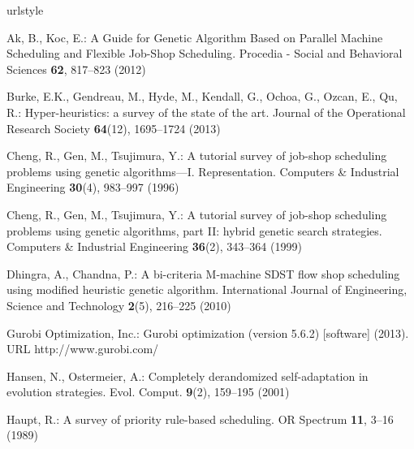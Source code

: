 \documentclass[graybox]{svmult}
\begin{document}
\clearpage

%
\begin{thebibliography}{10}
    \providecommand{\url}[1]{{#1}}
    \providecommand{\urlprefix}{URL }
    \expandafter\ifx\csname urlstyle\endcsname\relax
    \providecommand{\doi}[1]{DOI~\discretionary{}{}{}#1}\else
    \providecommand{\doi}{DOI~\discretionary{}{}{}\begingroup
    \urlstyle{rm}\Url}\fi
    
    Ak, B., Koc, E.: {A Guide for Genetic Algorithm Based on Parallel Machine  
    Scheduling and Flexible Job-Shop Scheduling}.
    \newblock Procedia - Social and Behavioral Sciences \textbf{62}, 817--823
    (2012)
    
    Burke, E.K., Gendreau, M., Hyde, M., Kendall, G., Ochoa, G., Ozcan, E., Qu, 
    R.:    Hyper-heuristics: a survey of the state of the art.
    \newblock Journal of the Operational Research Society \textbf{64}(12),
    1695--1724 (2013)
    
    Cheng, R., Gen, M., Tsujimura, Y.: {A tutorial survey of job-shop  
    scheduling problems using genetic algorithms—I. Representation}.
    \newblock Computers \& Industrial Engineering \textbf{30}(4), 983--997 
    (1996)
    
    Cheng, R., Gen, M., Tsujimura, Y.: {A tutorial survey of job-shop  
    scheduling problems using genetic algorithms, part II: hybrid genetic  
    search strategies}.
    \newblock Computers \& Industrial Engineering \textbf{36}(2), 343--364 
    (1999)
    
    Dhingra, A., Chandna, P.: {A bi-criteria M-machine SDST flow shop  
    scheduling using modified heuristic genetic algorithm}.
    \newblock International Journal of Engineering, Science and Technology
    \textbf{2}(5), 216--225 (2010)
    
    {Gurobi Optimization, Inc.}: Gurobi optimization (version 5.6.2) [software]
    (2013).
    \newblock \urlprefix\url{http://www.gurobi.com/}
    
    Hansen, N., Ostermeier, A.: Completely derandomized self-adaptation in
    evolution strategies.
    \newblock Evol. Comput. \textbf{9}(2), 159--195 (2001)
    
    Haupt, R.: A survey of priority rule-based scheduling.
    \newblock OR Spectrum \textbf{11}, 3--16 (1989)
    

\end{thebibliography}
\end{document}
